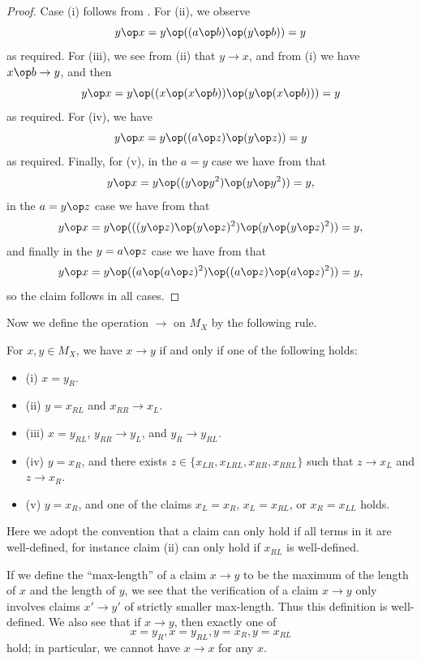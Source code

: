 \begin{proof}  Case (i) follows from .  For (ii), we observe
$$ y \op x = y \op ((a \op b) \op (y \op b)) = y$$
as required.  For (iii), we see from (ii) that $y \to x$, and from (i) we have $x \op b \to y$, and then
$$ y \op x = y \op ((x \op (x \op b)) \op (y \op (x \op b))) = y$$
as required.  For (iv), we have
$$ y \op x = y \op ((a \op z) \op (y \op z)) = y$$
as required.  Finally, for (v), in the $a=y$ case we have from  that
$$ y \op x = y \op ((y \op y^2) \op (y \op y^2)) = y,$$
in the $a = y \op z$ case we have from  that
$$ y \op x = y \op (((y \op z) \op (y \op z)^2) \op (y \op (y \op z)^2)) = y,$$
and finally in the $y = a \op z$ case we have from  that
$$ y \op x = y \op ( (a \op (a \op z)^2) \op ((a \op z) \op (a \op z)^2)) = y,$$
so the claim follows in all cases.
\end{proof}

Now we define the operation $\to$ on $M_X$ by the following rule.

\begin{definition}\label{free-relate} For $x,y \in M_X$, we have $x \to y$ if and only if one of the following holds:
\begin{itemize}
\item (i) $x = y_R$.
\item (ii) $y = x_{RL}$ and $x_{RR} \to x_L$.
\item (iii) $x = y_{RL}$, $y_{RR} \to y_L$, and $y_R \to y_{RL}$.
\item (iv) $y = x_R$, and there exists $z \in \{ x_{LR}, x_{LRL}, x_{RR}, x_{RRL} \}$ such that $z \to x_L$ and $z \to x_R$.
\item (v)  $y = x_R$, and one of the claims $x_L = x_R$, $x_L = x_{RL}$, or $x_R = x_{LL}$ holds.
\end{itemize}
Here we adopt the convention that a claim can only hold if all terms in it are well-defined, for instance claim (ii) can only hold if $x_{RL}$ is well-defined.
\end{definition}

If we define the ``max-length'' of a claim $x \to y$ to be the maximum of the length of $x$ and the length of $y$, we see that the verification of a claim $x \to y$ only involves claims $x' \to y'$ of strictly smaller max-length.  Thus this definition is well-defined.  We also see that if $x \to y$, then exactly one of
\begin{equation}\label{one}
  x=y_R, x=y_{RL}, y = x_R, y=x_{RL}
\end{equation}
hold; in particular, we cannot have $x \to x$ for any $x$.


